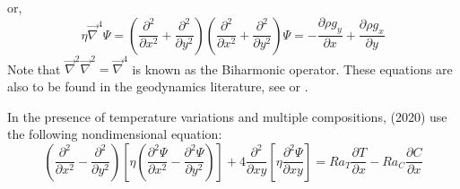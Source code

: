 or, 
\begin{equation}
\eta {\vec \nabla}^4 \Psi 
=
\left(\frac{\partial^2 }{\partial x^2} + \frac{\partial^2 }{\partial y^2} \right) 
\left(\frac{\partial^2 }{\partial x^2} + \frac{\partial^2 }{\partial y^2} \right) \Psi
=
-\frac{\partial \rho g_y}{\partial x} + \frac{\partial \rho g_x}{\partial y}   
\label{eq:sf1}
\end{equation}
Note that $\vec\nabla^2 \vec\nabla^2 = \vec\nabla^4 $ is known as the {\color{olive}Biharmonic operator}.
These equations are also to be found in the geodynamics literature, 
see \cite[eq. 1.43]{tack10} or \cite[p 70-71]{gery10}.

In the presence of temperature variations and multiple compositions, 
\textcite{trlb20} (2020)  use the  following nondimensional equation:
\[
\left(
\frac{\partial^2 }{\partial x^2} - 
\frac{\partial^2 }{\partial y^2}  
\right)
\left[ \eta
\left(
\frac{\partial^2 \Psi}{\partial x^2} - 
\frac{\partial^2 \Psi}{\partial y^2}  
\right)
\right]
+4
\frac{\partial^2 }{\partial xy} 
\left[
\eta 
\frac{\partial^2 \Psi}{\partial xy} 
\right]
=
Ra_T \frac{\partial T}{\partial x}-
Ra_C \frac{\partial C}{\partial x}
\]






